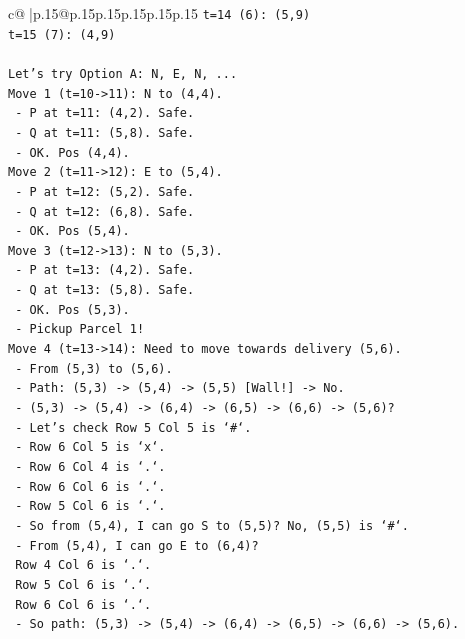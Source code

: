 \documentclass{article}
\begin{document}
{\begin{supertabular}{c@{$\;$}|p{.15\linewidth}@{}p{.15\linewidth}p{.15\linewidth}p{.15\linewidth}p{.15\linewidth}p{.15\linewidth}}
{{{\texttt{t=14 (6): (5,9)} \\
\texttt{t=15 (7): (4,9)} \\
\\ 
\texttt{Let's try Option A: N, E, N, ...} \\
\texttt{Move 1 (t=10{-}>11): N to (4,4).} \\
\texttt{  {-} P at t=11: (4,2). Safe.} \\
\texttt{  {-} Q at t=11: (5,8). Safe.} \\
\texttt{  {-} OK. Pos (4,4).} \\
\texttt{Move 2 (t=11{-}>12): E to (5,4).} \\
\texttt{  {-} P at t=12: (5,2). Safe.} \\
\texttt{  {-} Q at t=12: (6,8). Safe.} \\
\texttt{  {-} OK. Pos (5,4).} \\
\texttt{Move 3 (t=12{-}>13): N to (5,3).} \\
\texttt{  {-} P at t=13: (4,2). Safe.} \\
\texttt{  {-} Q at t=13: (5,8). Safe.} \\
\texttt{  {-} OK. Pos (5,3).} \\
\texttt{  {-} Pickup Parcel 1!} \\
\texttt{Move 4 (t=13{-}>14): Need to move towards delivery (5,6).} \\
\texttt{  {-} From (5,3) to (5,6).} \\
\texttt{  {-} Path: (5,3) {-}> (5,4) {-}> (5,5) {[}Wall!{]} {-}> No.} \\
\texttt{  {-} (5,3) {-}> (5,4) {-}> (6,4) {-}> (6,5) {-}> (6,6) {-}> (5,6)?} \\
\texttt{  {-} Let's check Row 5 Col 5 is `\#`.} \\
\texttt{  {-} Row 6 Col 5 is `x`.} \\
\texttt{  {-} Row 6 Col 4 is `.`.} \\
\texttt{  {-} Row 6 Col 6 is `.`.} \\
\texttt{  {-} Row 5 Col 6 is `.`.} \\
\texttt{  {-} So from (5,4), I can go S to (5,5)? No, (5,5) is `\#`.} \\
\texttt{  {-} From (5,4), I can go E to (6,4)?} \\
\texttt{    Row 4 Col 6 is `.`.} \\
\texttt{    Row 5 Col 6 is `.`.} \\
\texttt{    Row 6 Col 6 is `.`.} \\
\texttt{  {-} So path: (5,3) {-}> (5,4) {-}> (6,4) {-}> (6,5) {-}> (6,6) {-}> (5,6).} \\
}}}
\end{supertabular}}
\end{document}
